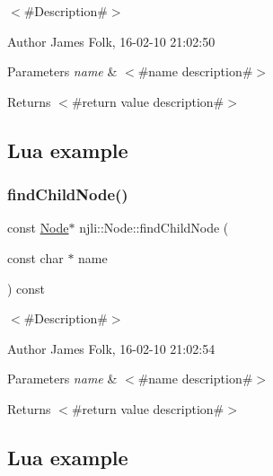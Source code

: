 $<$\#\+Description\#$>$ 

\begin{DoxyAuthor}{Author}
James Folk, 16-\/02-\/10 21\+:02\+:50
\end{DoxyAuthor}

\begin{DoxyParams}{Parameters}
{\em name} & $<$\#name description\#$>$\\
\hline
\end{DoxyParams}
\begin{DoxyReturn}{Returns}
$<$\#return value description\#$>$
\end{DoxyReturn}
\hypertarget{classnjli_1_1_steering_behavior_wander_ex1}{}\subsection{Lua example}\label{classnjli_1_1_steering_behavior_wander_ex1}

\begin{DoxyCodeInclude}
\end{DoxyCodeInclude}
\mbox{\label{classnjli_1_1_node_adee1d24767f0aae877ee2275b8406e99}} 
\subsubsection{\texorpdfstring{find\+Child\+Node()}{findChildNode()}\hspace{0.1cm}{\footnotesize\ttfamily [2/2]}}
{\footnotesize\ttfamily const \mbox{\hyperlink{classnjli_1_1_node}{Node}}$\ast$ njli\+::\+Node\+::find\+Child\+Node (\begin{DoxyParamCaption}\item[{const char $\ast$}]{name }\end{DoxyParamCaption}) const}



$<$\#\+Description\#$>$ 

\begin{DoxyAuthor}{Author}
James Folk, 16-\/02-\/10 21\+:02\+:54
\end{DoxyAuthor}

\begin{DoxyParams}{Parameters}
{\em name} & $<$\#name description\#$>$\\
\hline
\end{DoxyParams}
\begin{DoxyReturn}{Returns}
$<$\#return value description\#$>$
\end{DoxyReturn}
\hypertarget{classnjli_1_1_steering_behavior_wander_ex1}{}\subsection{Lua example}\label{classnjli_1_1_steering_behavior_wander_ex1}

